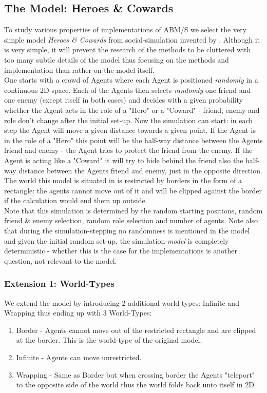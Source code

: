 \subsection{The Model: Heroes \& Cowards}
To study various properties of implementations of ABM/S we select the very simple model \textit{Heroes \& Cowards} from social-simulation invented by \cite{wilensky_introduction_2015}. Although it is very simple, it will prevent the research of the methods to be cluttered with too many subtle details of the model thus focusing on the methods and implementation than rather on the model itself. \\
One starts with a crowd of Agents where each Agent is positioned \textit{randomly} in a continuous 2D-space. Each of the Agents then selects \textit{randomly} one friend and one enemy (except itself in both cases) and decides with a given probability whether the Agent acts in the role of a "Hero" or a "Coward" - friend, enemy and role don't change after the initial set-up. Now the simulation can start: in each step the Agent will move a given distance towards a given point. If the Agent is in the role of a "Hero" this point will be the half-way distance between the Agents friend and enemy - the Agent tries to protect the friend from the enemy. If the Agent is acting like a "Coward" it will try to hide behind the friend also the half-way distance between the Agents friend and enemy, just in the opposite direction. \\
The world this model is situated in is restricted by borders in the form of a rectangle: the agents cannot move out of it and will be clipped against the border if the calculation would end them up outside. \\
Note that this simulation is determined by the random starting positions, random friend \& enemy selection, random role selection and number of agents. Note also that during the simulation-stepping no randomness is mentioned in the model and given the initial random set-up, the simulation-\textit{model} is completely deterministic - whether this is the case for the implementations is another question, not relevant to the model. 

\subsubsection{Extension 1: World-Types}
We extend the model by introducing 2 additional world-types: Infinite and Wrapping thus ending up with 3 World-Types:

\begin{enumerate}
\item Border - Agents cannot move out of the restricted rectangle and are clipped at the border. This is the world-type of the original model.
\item Infinite - Agents can move unrestricted.
\item Wrapping - Same as Border but when crossing border the Agents "teleport" to the opposite side of the world thus the world folds back unto itself in 2D.
\end{enumerate}

